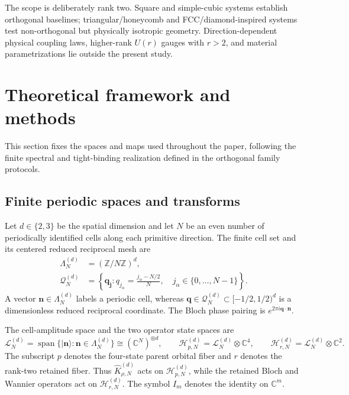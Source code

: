 \documentclass[11pt]{article}
\newcommand{\C}{\mathbb C}
\begin{document}
The scope is deliberately rank two. Square and simple-cubic systems establish
orthogonal baselines; triangular/honeycomb and FCC/diamond-inspired systems test
non-orthogonal but physically isotropic geometry. Direction-dependent physical coupling
laws, higher-rank $U(r)$ gauges with $r>2$, and material parametrizations lie outside the
present study.

\section{Theoretical framework and methods}

This section fixes the spaces and maps used throughout the paper, following the finite
spectral and tight-binding realization defined in the orthogonal family protocols.

\subsection{Finite periodic spaces and transforms}

Let $d\in\{2,3\}$ be the spatial dimension and let $N$ be an even number of periodically
identified cells along each primitive direction. The finite cell set and its centered
reduced reciprocal mesh are
\begin{align}
 \Lambda_N^{(d)}&=(\mathbb Z/N\mathbb Z)^d,\\
 \mathcal Q_N^{(d)}
 &=\left\{\mathbf q_{\mathbf j}:q_{j_\alpha}
   =\frac{j_\alpha-N/2}{N},\quad
   j_\alpha\in\{0,\ldots,N-1\}\right\}.
 \label{eq:finite-cell-and-mesh}
\end{align}
A vector $\mathbf n\in\Lambda_N^{(d)}$ labels a periodic cell, whereas
$\mathbf q\in\mathcal Q_N^{(d)}\subset[-1/2,1/2)^d$ is a dimensionless reduced
reciprocal coordinate. The Bloch phase pairing is
$e^{2\pi i\mathbf q\cdot\mathbf n}$.

The cell-amplitude space and the two operator state spaces are
\begin{equation}
 \mathcal L_N^{(d)}
 =\operatorname{span}\{\lvert\mathbf n\rangle:\mathbf n\in\Lambda_N^{(d)}\}
 \cong(\C^N)^{\otimes d},\qquad
 \mathcal H_{p,N}^{(d)}=\mathcal L_N^{(d)}\otimes\C^4,
 \qquad
 \mathcal H_{r,N}^{(d)}=\mathcal L_N^{(d)}\otimes\C^2.
 \label{eq:spaces}
\end{equation}
The subscript $p$ denotes the four-state parent orbital fiber and $r$ denotes the
rank-two retained fiber. Thus $\widehat K_{\rho,N}^{(d)}$ acts on
$\mathcal H_{p,N}^{(d)}$, while the retained Bloch and Wannier operators act on
$\mathcal H_{r,N}^{(d)}$. The symbol $I_m$ denotes the identity on $\C^m$.
\end{document}
